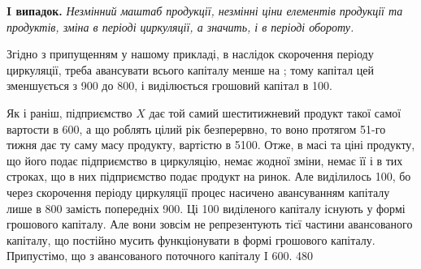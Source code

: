 \textbf{I випадок.} \emph{Незмінний маштаб продукції, незмінні ціни елементів
продукції та продуктів, зміна в періоді циркуляції, а значить, і в періоді
обороту.}

Згідно з припущенням у нашому прикладі, в наслідок скорочення періоду
циркуляції, треба авансувати всього капіталу менше на ; тому
капітал цей зменшується з 900 до 800, і виділюється грошовий
капітал в 100.

Як і раніш, підприємство $X$ дає той самий шеститижневий продукт такої
самої вартости в 600, а що роблять цілий рік безперервно, то
воно протягом 51-го тижня дає ту саму масу продукту, вартістю в 5100. Отже, в масі та ціні продукту, що його подає підприємство в
циркуляцію, немає жодної зміни, немає її і в тих строках, що в них підприємство
подає продукт на ринок. Але виділилось 100, бо
через скорочення періоду циркуляції процес насичено авансуванням капіталу
лише в 800 замість попередніх 900. Ці 100 виділеного капіталу існують у формі грошового капіталу. Але вони
зовсім не репрезентують тієї частини авансованого капіталу, що постійно
мусить функціонувати в формі грошового капіталу. Припустімо, що з
авансованого поточного капіталу I \deq{} 600.  \deq{} 480
\parbreak{}  %
